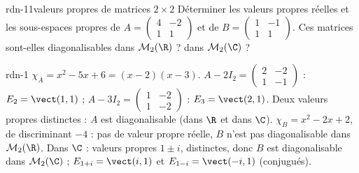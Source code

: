 
\begin{exo}{rdn-1}{1}{valeurs propres de matrices $2\times2$}
Déterminer les valeurs propres réelles et les sous-espaces propres de $A=\begin{pmatrix}4&-2\\1&1\end{pmatrix}$ et de
$B=\begin{pmatrix}1&-1\\1&1\end{pmatrix}$. Ces matrices sont-elles diagonalisables dans $\mathcal M_2(\R)$ ? dans $\mathcal M_2(\C)$ ?
\end{exo}
\begin{corrige}{rdn-1}
$\chi_A=x^2-5x+6=(x-2)(x-3)$. $A-2I_2=\begin{pmatrix}2&-2\\1&-1\end{pmatrix}$ : $E_2=\vect(1,1)$ ; $A-3I_2=\begin{pmatrix}1&-2\\1&-2\end{pmatrix}$ :
$E_3=\vect(2,1)$. Deux valeurs propres distinctes : $A$ est diagonalisable (dans $\R$ et dans $\C$).
$\chi_B=x^2-2x+2$, de discriminant $-4$ : pas de valeur propre réelle, $B$ n'est pas diagonalisable dans $\mathcal M_2(\R)$.
Dans $\C$ : valeurs propres $1\pm i$, distinctes, donc $B$ est diagonalisable dans $\mathcal M_2(\C)$ ; $E_{1+i}=\vect(i,1)$ et
$E_{1-i}=\vect(-i,1)$ (conjugués).
\end{corrige}

